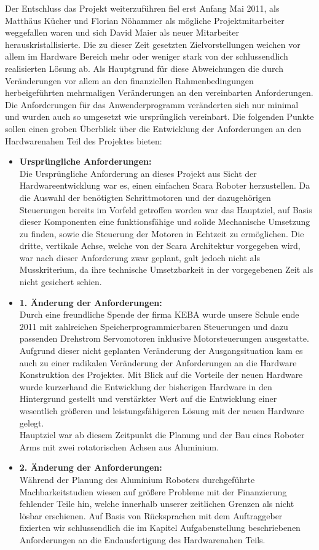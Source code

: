 Der Entschluss das Projekt weiterzuführen fiel erst Anfang Mai 2011, als Matthäus Kücher und Florian Nöhammer als mögliche Projektmitarbeiter weggefallen waren und sich David Maier als neuer Mitarbeiter herauskristallisierte. 
Die zu dieser Zeit gesetzten Zielvorstellungen weichen vor allem im Hardware Bereich mehr oder weniger stark von der schlussendlich realisierten Lösung ab. Als Hauptgrund für diese Abweichungen die durch Veränderungen vor allem an den finanziellen Rahmenbedingungen herbeigeführten mehrmaligen Veränderungen an den vereinbarten Anforderungen. Die Anforderungen für das Anwenderprogramm veränderten sich nur minimal und wurden auch so umgesetzt wie ursprünglich vereinbart.
Die folgenden Punkte sollen einen groben Überblick über die Entwicklung der Anforderungen an den Hardwarenahen Teil des Projektes bieten:\\
\begin{itemize}
\item \textbf{Ursprüngliche Anforderungen:}\\
Die Ursprüngliche Anforderung an dieses Projekt aus Sicht der Hardwareentwicklung war es, einen einfachen Scara Roboter herzustellen. Da die Auswahl der benötigten Schrittmotoren und der dazugehörigen Steuerungen bereits im Vorfeld getroffen worden war das Hauptziel, auf Basis dieser Komponenten eine funktionsfähige und solide Mechanische Umsetzung zu finden, sowie die Steuerung der Motoren in Echtzeit zu ermöglichen.
Die dritte, vertikale Achse, welche von der Scara Architektur vorgegeben wird, war nach dieser Anforderung zwar geplant, galt jedoch nicht als Musskriterium, da ihre technische Umsetzbarkeit in der vorgegebenen Zeit als nicht gesichert schien.
\newpage
\item \textbf{1. Änderung der Anforderungen:}\\
Durch eine freundliche Spende der firma KEBA wurde unsere Schule ende 2011 mit zahlreichen Speicherprogrammierbaren Steuerungen und dazu passenden Drehstrom Servomotoren inklusive Motorsteuerungen ausgestatte. Aufgrund dieser nicht geplanten Veränderung der Ausgangsituation kam es auch zu einer radikalen Veränderung der Anforderungen an die Hardware Konstruktion des Projektes. 
Mit Blick auf die Vorteile der neuen Hardware wurde kurzerhand die Entwicklung der bisherigen Hardware in den Hintergrund gestellt und verstärkter Wert auf die Entwicklung einer wesentlich größeren und leistungsfähigeren Lösung mit der neuen Hardware gelegt.\\
Hauptziel war ab diesem Zeitpunkt die Planung und der Bau eines Roboter Arms mit zwei rotatorischen Achsen aus Aluminium.

\item \textbf{2. Änderung der Anforderungen:}\\
Während der Planung des Aluminium Roboters durchgeführte Machbarkeitstudien wiesen auf größere Probleme mit der Finanzierung fehlender Teile hin, welche innerhalb unserer zeitlichen Grenzen als nicht lösbar erschienen. Auf Basis von Rücksprachen mit dem Auftraggeber fixierten wir schlussendlich die im Kapitel Aufgabenstellung beschriebenen Anforderungen an die Endausfertigung des Hardwarenahen Teils.
\end{itemize}
